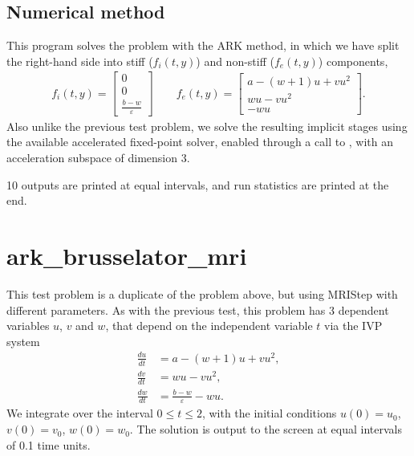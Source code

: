 \documentclass[letterpaper,10pt,english]{sphinxmanual}
\begin{document}
\subsection{Numerical method}
\label{\detokenize{c_serial:id9}}
This program solves the problem with the ARK method, in which we have
split the right-hand side into stiff (\(f_i(t,y)\)) and non-stiff
(\(f_e(t,y)\)) components,
\begin{equation*}
\begin{split}f_i(t,y) = \left[\begin{array}{c}
   0 \\ 0 \\ \frac{b-w}{\varepsilon}
\end{array}\right]
\qquad
f_e(t,y) = \left[\begin{array}{c}
   a - (w+1)u + v u^2 \\ w u - v u^2 \\ - w u
\end{array}\right].\end{split}
\end{equation*}
Also unlike the previous test problem, we solve the resulting implicit
stages using the available accelerated fixed-point solver, enabled
through a call to , with an acceleration
subspace of dimension 3.

10 outputs are printed at equal intervals, and run statistics
are printed at the end.


\section{ark\_brusselator\_mri}
\label{\detokenize{c_serial:ark-brusselator-mri}}\label{\detokenize{c_serial:id10}}
This test problem is a duplicate of the  problem
above, but using MRIStep with different parameters.  As with the
previous test, this problem has 3 dependent variables \(u\), \(v\) and
\(w\), that depend on the independent variable \(t\) via the IVP system
\begin{equation*}
\begin{split}\frac{du}{dt} &= a - (w+1)u + v u^2, \\
\frac{dv}{dt} &= w u - v u^2, \\
\frac{dw}{dt} &= \frac{b-w}{\varepsilon} - w u.\end{split}
\end{equation*}
We integrate over the interval \(0 \le t \le 2\), with the
initial conditions \(u(0) = u_0\), \(v(0) = v_0\), \(w(0)
= w_0\).  The solution is output to the screen at equal intervals of 0.1 time
units.
\end{document}
